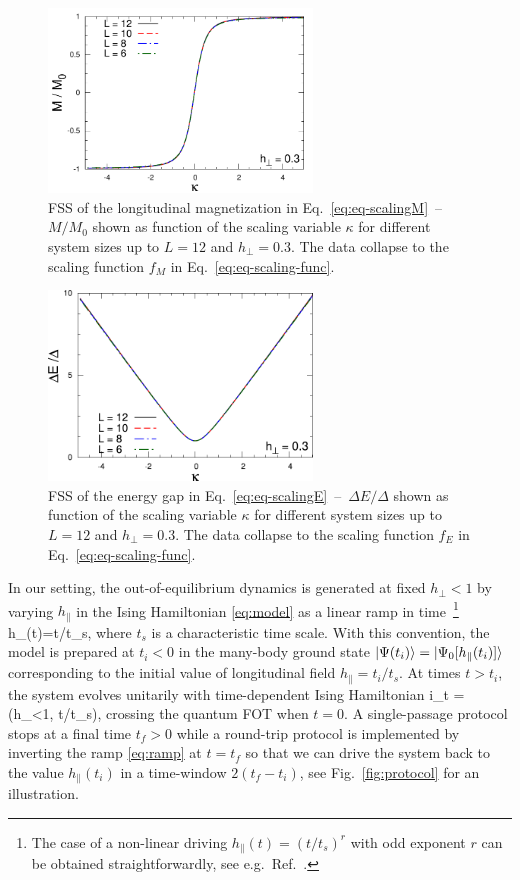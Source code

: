 \begin{figure}[t]
\centering
\includegraphics[width=7cm]{imm/magn.pdf}\\
\caption{FSS of the longitudinal magnetization in Eq.~\eqref{eq:eq-scalingM}~--~$M/M_0$ shown as function of the scaling variable $\kappa$ for different system sizes up to $L=12$ and $h_\perp=0.3$. The data collapse to the scaling function $f_M$ in Eq.~\eqref{eq:eq-scaling-func}.}\label{fig:eq-FSS-M}
\includegraphics[width=7cm]{imm/gap-2.pdf}
\caption{FSS of the energy gap in Eq.~\eqref{eq:eq-scalingE}~--~$\Delta E/\Delta$ shown as function of the scaling variable $\kappa$ for different system sizes up to $L=12$ and $h_\perp=0.3$. The data collapse to the scaling function $f_E$ in Eq.~\eqref{eq:eq-scaling-func}.}\label{fig:eq-FSS-E}
\end{figure}

In our setting, the out-of-equilibrium dynamics is generated at fixed $h_\perp<1$ by varying $h_\parallel$ in the Ising Hamiltonian \eqref{eq:model} as a linear ramp in time~\footnote{The case of a non-linear driving $h_\parallel(t)=(t/t_s)^r$ with odd exponent $r$ can be obtained straightforwardly, see e.g.~Ref.~\cite{dziarmaga2010dynamics}.}
\be\label{eq:ramp}
h_\parallel(t)=t/t_s,
\ee
where $t_s$ is a characteristic time scale. With this convention, the model is prepared at $t_i<0$ in the many-body ground state $\ket{\Psi(t_i)}=\ket{\Psi_0[h_\parallel(t_i)]}$ corresponding to the initial value of longitudinal field $h_\parallel=t_i/t_s$. At times $t>t_i$, the system evolves unitarily with time-dependent Ising Hamiltonian 
\be\label{eq:schrodinger}
i\de_t = (h_\perp<1, t/t_s),
\ee
crossing the quantum FOT when $t=0$. A single-passage protocol stops at a final time $t_f>0$ while a round-trip protocol is implemented by inverting the ramp \eqref{eq:ramp} at $t=t_f$ so that we can drive the system back to the value $h_\parallel(t_i)$ in a time-window $2(t_f-t_i)$, see Fig.~\ref{fig:protocol} for an illustration.\\



